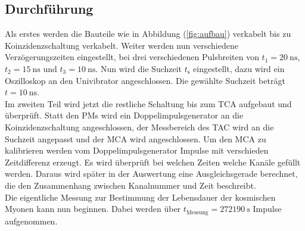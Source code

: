 \subsection{Durchführung}
Als erstes werden die Bauteile wie in Abbildung (\ref{fig:aufbau}) verkabelt bis zu Koinzidenzschaltung verkabelt. Weiter werden nun verschiedene Verzögerungszeiten eingestellt, bei drei verschiedenen Pulsbreiten von $t_1=\SI{20}{\nano\second}$, $t_2=\SI{15}{\nano\second}$ und $t_3=\SI{10}{\nano\second}$. Nun wird die Suchzeit $t_\mathrm{s}$ eingestellt, dazu wird ein Oszilloskop an den Univibrator angeschlossen. Die gewählte Suchzeit beträgt $t=\SI{10}{\nano\second}$. \\
Im zweiten Teil wird jetzt die restliche Schaltung bis zum TCA aufgebaut und überprüft. Statt den PMs wird ein Doppelimpulsgenerator an die Koinzidenzschaltung angeschlossen, der Messbereich des TAC wird an die Suchzeit angepasst und der MCA wird angeschlossen. Um den MCA zu kalibrieren werden vom Doppelimpulsgenerator Impulse mit verschieden Zeitdifferenz erzeugt. Es wird überprüft bei welchen
Zeiten welche Kanäle gefüllt werden. Daraus wird später in der Auswertung eine Ausgleichsgerade berechnet, die den Zusammenhang zwischen Kanalnummer und Zeit beschreibt. \\
Die eigentliche Messung zur Bestimmung der Lebensdauer der kosmischen Myonen kann nun beginnen. Dabei werden über $t_\mathrm{Messung}=\SI{272190}{\second}$ Impulse aufgenommen.

